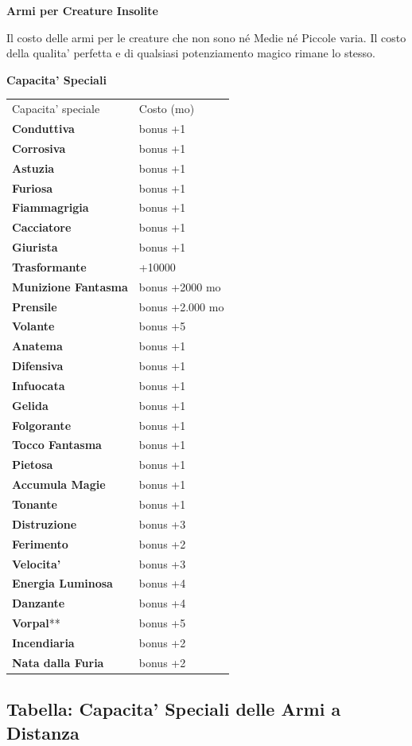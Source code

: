 \documentclass[a4paper,11pt,twoside,openany]{dndbook}
\begin{document}
{\textbf{Armi per Creature Insolite}

Il costo delle armi per le creature che non sono né Medie né Piccole varia. Il costo della qualita' perfetta e di qualsiasi potenziamento
magico rimane lo stesso.

\textbf{Capacita' Speciali}

\bigskip

\begin{tabular}[c]{@{}ll@{}}
\toprule 
Capacita' speciale & Costo (mo)\tabularnewline
\textbf{Conduttiva} \index{Conduttiva} & bonus +1\tabularnewline
\textbf{Corrosiva}\index{Corrosiva} & bonus +1\tabularnewline
\textbf{Astuzia} \index{Astuzia}& bonus +1\tabularnewline
\textbf{Furiosa} \index{Furiosa} & bonus +1\tabularnewline
\textbf{Fiammagrigia} \index{Fiammagrigia}& bonus +1\tabularnewline
\textbf{Cacciatore} \index{Cacciatore} & bonus +1\tabularnewline
\textbf{Giurista} \index{Giurista} & bonus +1\tabularnewline
\textbf{Trasformante} \index{Trasformante} & +10000\tabularnewline
\textbf{Munizione Fantasma} \index{Munizione Fantasma} & bonus +2000 mo\tabularnewline
\textbf{Prensile} \index{Prensile}& bonus +2.000 mo\tabularnewline
\textbf{Volante} \index{Volante}& bonus +5\tabularnewline
\textbf{Anatema}\index{Anatema} & bonus +1\tabularnewline
\textbf{Difensiva}\index{Difensiva} & bonus +1\tabularnewline
\textbf{Infuocata} \index{Infuocata}& bonus +1\tabularnewline
\textbf{Gelida} \index{Gelida} & bonus +1\tabularnewline
\textbf{Folgorante} \index{Folgorante} & bonus +1\tabularnewline
\textbf{Tocco Fantasma} \index{Tocco Fantasma} & bonus +1\tabularnewline
\textbf{Pietosa} \index{Pietosa} & bonus +1\tabularnewline
\textbf{Accumula Magie} \index{Accumula Magie} & bonus +1\tabularnewline
\textbf{Tonante} \index{Tonante} & bonus +1\tabularnewline
\textbf{Distruzione} \index{Distruzione}& bonus +3\tabularnewline
\textbf{Ferimento} \index{Ferimento} & bonus +2\tabularnewline
\textbf{Velocita'} \index{Velocita'} & bonus +3\tabularnewline
\textbf{Energia Luminosa} \index{Energia Luminosa}& bonus +4\tabularnewline
\textbf{Danzante} \index{Danzante} & bonus +4\tabularnewline
\textbf{Vorpal}{*}{*} \index{Vorpal} & bonus +5\tabularnewline
\textbf{Incendiaria} \index{Incendiaria} & bonus +2\tabularnewline
\textbf{Nata dalla Furia} \index{Nata dalla Furia} & bonus +2\tabularnewline
\bottomrule
\end{tabular}

\subsection{Tabella: Capacita' Speciali delle Armi a Distanza}

}
\end{document}
